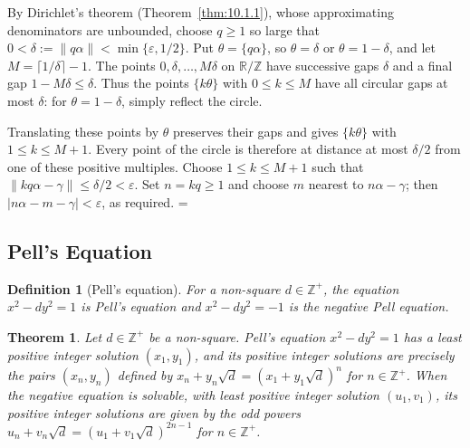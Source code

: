 \documentclass[11pt]{article}
\makeatletter
\let\nt@closedisplay\]
\def\nt@guardedclose{\@ifnextchar\par{\nt@closeafterpar}{\@ifnextchar\end{\postdisplaypenalty\@M\nt@closedisplay}{\nt@closedisplay}}}
\def\nt@closeafterpar\par{\@ifnextchar\par{\nt@closeafterpar}{\@ifnextchar\end{\postdisplaypenalty\@M\nt@closedisplay\par}{\nt@closedisplay\par}}}
\renewenvironment{proof}[1][\proofname]{\par
  \pushQED{\qed}\normalfont\topsep\medskipamount\edef\nt@afterproof{\@endparpenalty=\the\@endparpenalty\relax}\@beginparpenalty\@M\@endparpenalty\@M\let\]\nt@guardedclose\trivlist\item[]\textit{#1\@addpunct{.}} \ignorespaces}{\ifvmode\addpenalty\@M\fi\popQED\nt@afterproof\endtrivlist\@endpefalse}
\theoremstyle{ntstyle}
\newtheorem{theorem}{Theorem}[subsection]
\newtheorem{definition}{Definition}[subsection]
\makeatother
\begin{document}
\begin{proof} By Dirichlet's theorem (Theorem~\ref{thm:10.1.1}), whose
  approximating denominators are unbounded, choose $q\ge1$ so large that
  $0<\delta:=\lVert q\alpha\rVert<\min\{\varepsilon,1/2\}$.
  Put $\theta=\{q\alpha\}$, so $\theta=\delta$ or $\theta=1-\delta$,
  and let $M=\lceil1/\delta\rceil-1$.
  The points $0,\delta,\ldots,M\delta$ on $\mathbb{R}/\mathbb{Z}$
  have successive gaps $\delta$ and a final gap $1-M\delta\le\delta$.
  Thus the points $\{k\theta\}$ with $0\le k\le M$ have all circular gaps
  at most $\delta$: for $\theta=1-\delta$, simply reflect the circle.

  Translating these points by $\theta$ preserves their gaps and gives
  $\{k\theta\}$ with $1\le k\le M+1$. Every point of the circle is
  therefore at distance at most $\delta/2$ from one of these positive
  multiples. Choose $1\le k\le M+1$ such that
  $\lVert kq\alpha-\gamma\rVert\le\delta/2<\varepsilon$.
  Set $n=kq\ge1$ and choose $m$ nearest to $n\alpha-\gamma$; then
  $|n\alpha-m-\gamma|<\varepsilon$, as required.
\end{proof}
\subsection{Pell's Equation}

\begin{definition}[Pell's equation]\label{def:10.7.1}\label{def:pell-equation}
  For a non-square
  $d\in\mathbb{Z}^+$, the equation $x^2-dy^2=1$ is Pell's equation and $x^2-dy^2=-1$
  is the negative Pell equation.

\end{definition}

\begin{theorem}\label{thm:10.7.1} Let $d\in\mathbb{Z}^+$ be a non-square.
  Pell's equation $x^2-dy^2=1$ has a least positive integer solution $(x_1,y_1)$,
  and its positive integer solutions are precisely the pairs $(x_n,y_n)$
  defined by
  $x_n+y_n\sqrt{d}=(x_1+y_1\sqrt{d})^{n}$ for $n\in\mathbb{Z}^+$.
  When the negative equation is solvable,
  with least positive integer solution $(u_1,v_1)$, its positive integer
  solutions are given by the odd powers $u_n+v_n\sqrt {d}=(u_1+v_1\sqrt{d})^{2n-1}$ for $n\in\mathbb{Z}^+$.

\end{theorem}
\end{document}
